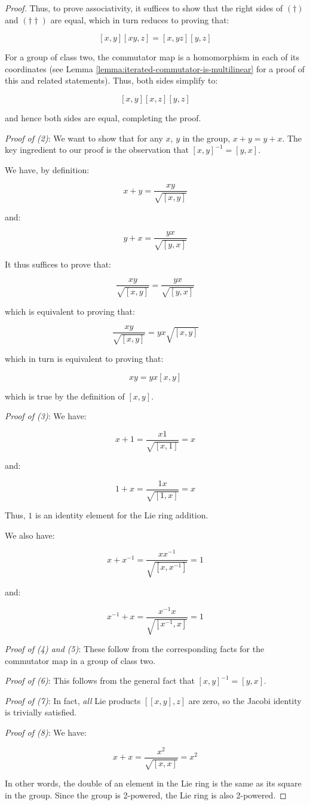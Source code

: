 \begin{proof}
  Thus, to prove associativity, it suffices to show that the right
  sides of $(\dagger)$ and $(\dagger\dagger)$ are equal, which in turn
  reduces to proving that:

  $$ [x,y][xy,z] = [x,yz][y,z]$$

  For a group of class two, the commutator map is a homomorphism in
  each of its coordinates (see Lemma
  \ref{lemma:iterated-commutator-is-multilinear} for a proof of this
  and related statements). Thus, both sides simplify to:

  $$[x,y][x,z][y,z]$$

  and hence both sides are equal, completing the proof.

  {\em Proof of (2)}: We want to show that for any $x$, $y$ in the
  group, $x + y = y + x$. The key ingredient to our proof is the
  observation that $[x,y]^{-1} = [y,x]$.

  We have, by definition:

  $$x + y = \frac{xy}{\sqrt{[x,y]}}$$

  and:

  $$y + x = \frac{yx}{\sqrt{[y,x]}}$$

  It thus suffices to prove that:

  $$\frac{xy}{\sqrt{[x,y]}} = \frac{yx}{\sqrt{[y,x]}}$$
  
  which is equivalent to proving that:

  $$\frac{xy}{\sqrt{[x,y]}} = yx\sqrt{[x,y]}$$

  which in turn is equivalent to proving that:

  $$xy = yx[x,y]$$

  which is true by the definition of $[x,y]$.

  {\em Proof of (3)}: We have:

  $$x + 1 = \frac{x1}{\sqrt{[x,1]}} = x$$

  and:

  $$1 + x = \frac{1x}{\sqrt{[1,x]}} = x$$

  Thus, $1$ is an identity element for the Lie ring addition.

  We also have:

  $$x + x^{-1} = \frac{xx^{-1}}{\sqrt{[x,x^{-1}]}} = 1$$

  and:

  $$x^{-1} + x = \frac{x^{-1}x}{\sqrt{[x^{-1},x]}} = 1$$

  {\em Proof of (4) and (5)}: These follow from the corresponding
  facts for the commutator map in a group of class two.

  {\em Proof of (6)}: This follows from the general fact that
  $[x,y]^{-1} = [y,x]$.

  {\em Proof of (7)}: In fact, {\em all} Lie products $[[x,y],z]$ are
  zero, so the Jacobi identity is trivially satisfied.

  {\em Proof of (8)}: We have:

  $$x + x = \frac{x^2}{\sqrt{[x,x]}} = x^2$$

  In other words, the double of an element in the Lie ring is the same
  as its square in the group. Since the group is 2-powered, the Lie
  ring is also 2-powered.
\end{proof}

